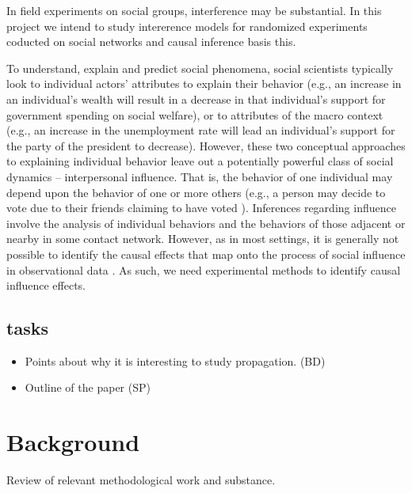 \documentclass[12pt]{article}
\begin{document}
In field experiments on social groups, interference may be substantial. In this project we intend to study intererence models for randomized experiments coducted on social networks and causal inference basis this.

To understand, explain and predict social phenomena, social scientists typically look to individual actors' attributes to explain their behavior (e.g., an increase in an individual's wealth will result in a decrease in that individual's support for government spending on social welfare), or to attributes of the macro context (e.g., an increase in the unemployment rate will lead an individual's support for the party of the president to decrease). However, these two conceptual approaches to explaining individual behavior leave out a potentially powerful class of social dynamics -- interpersonal influence. That is, the behavior of one individual may depend upon the behavior of one or more others (e.g., a person may decide to vote due to their friends claiming to have voted \citep{Bond:2012}). Inferences regarding influence involve the analysis of individual behaviors and the behaviors of those adjacent or nearby in some contact network. However, as in most settings, it is generally not possible to identify the causal effects that map onto the process of social influence in observational data \citep{Shalizi:2010}. As such, we need experimental methods to identify causal influence effects.

\subsection{tasks}
\begin{itemize}
\item Points about why it is interesting to study propagation. (BD)
\item Outline of the paper (SP)
\end{itemize}

\section{Background}

Review of relevant methodological work and substance.
\end{document}
